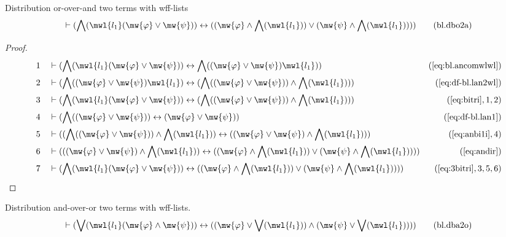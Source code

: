 \begin{lemma} Distribution or-over-and two terms with
wff-lists
\begin{align}
\vdash ( \bigwedge( \mwl{l_1} ( \mw{\varphi} \vee \mw{\psi} ) ) \leftrightarrow
    ( ( \mw{\varphi} \wedge \bigwedge( \mwl{l_1} ) ) \vee ( \mw{\psi} \wedge
    \bigwedge( \mwl{l_1} ) ) ) )\label{eq:bl.dbo2a}\tag{bl.dbo2a}
\end{align}
\end{lemma}

\begin{proof}
\begin{align}
  1 &&  & \vdash ( \bigwedge( \mwl{l_1} ( \mw{\varphi} \vee \mw{\psi} ) ) \leftrightarrow \bigwedge( ( \mw{\varphi} \vee \mw{\psi} ) \mwl{l_1} ) )&(\mbox{\ref{eq:bl.ancomwlwl}})\notag
  \\ 2 &&  & \vdash ( \bigwedge( ( \mw{\varphi} \vee \mw{\psi} ) \mwl{l_1} ) \leftrightarrow ( \bigwedge( ( \mw{\varphi} \vee \mw{\psi} ) ) \wedge \bigwedge( \mwl{l_1} ) ) )&(\mbox{\ref{eq:df-bl.lan2wl}})\notag
  \\ 3 &&  & \vdash ( \bigwedge( \mwl{l_1} ( \mw{\varphi} \vee \mw{\psi} ) ) \leftrightarrow ( \bigwedge( ( \mw{\varphi} \vee \mw{\psi} ) ) \wedge \bigwedge( \mwl{l_1} ) ) )&(\mbox{\ref{eq:bitri}},1,2)\notag
  \\ 4 &&  & \vdash ( \bigwedge( ( \mw{\varphi} \vee \mw{\psi} ) ) \leftrightarrow ( \mw{\varphi} \vee \mw{\psi} ) )&(\mbox{\ref{eq:df-bl.lan1}})\notag
  \\ 5 &&  & \vdash ( ( \bigwedge( ( \mw{\varphi} \vee \mw{\psi} ) ) \wedge \bigwedge( \mwl{l_1} ) ) \leftrightarrow ( ( \mw{\varphi} \vee \mw{\psi} ) \wedge \bigwedge( \mwl{l_1} ) ) )&(\mbox{\ref{eq:anbi1i}},4)\notag
  \\ 6 &&  & \vdash ( ( ( \mw{\varphi} \vee \mw{\psi} ) \wedge \bigwedge( \mwl{l_1} ) ) \leftrightarrow ( ( \mw{\varphi} \wedge \bigwedge( \mwl{l_1} ) ) \vee ( \mw{\psi} \wedge \bigwedge( \mwl{l_1} ) ) ) )&(\mbox{\ref{eq:andir}})\notag
  \\ 7 &&  & \vdash ( \bigwedge( \mwl{l_1} ( \mw{\varphi} \vee \mw{\psi} ) ) \leftrightarrow ( ( \mw{\varphi} \wedge \bigwedge( \mwl{l_1} ) ) \vee ( \mw{\psi} \wedge \bigwedge( \mwl{l_1} ) ) ) )&(\mbox{\ref{eq:3bitri}},3,5,6)\notag
\end{align}
\end{proof}

\begin{lemma} Distribution and-over-or two terms with
wff-lists.
\begin{align}
\vdash ( \bigvee( \mwl{l_1} ( \mw{\varphi} \wedge \mw{\psi} ) ) \leftrightarrow
    ( ( \mw{\varphi} \vee \bigvee( \mwl{l_1} ) ) \wedge ( \mw{\psi} \vee
    \bigvee( \mwl{l_1} ) ) ) )\label{eq:bl.dba2o}\tag{bl.dba2o}
\end{align}
\end{lemma}

